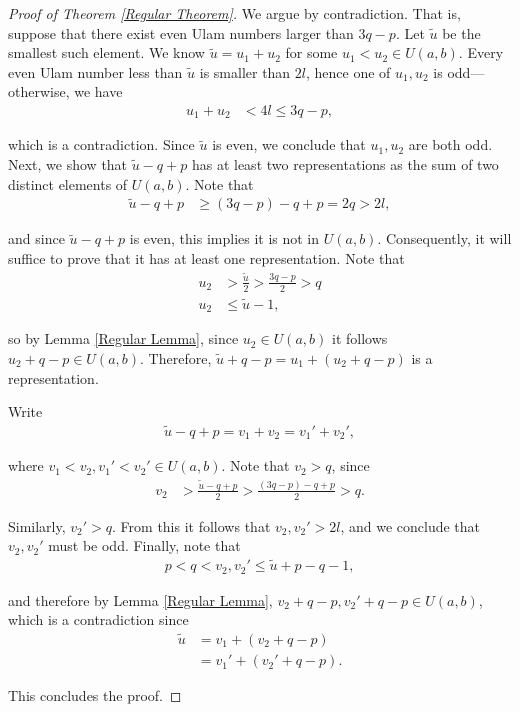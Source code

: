 \documentclass{amsart}
\theoremstyle{theorem}
\theoremstyle{definition}
\begin{document}
\begin{proof}[Proof of Theorem \ref{Regular Theorem}]
We argue by contradiction. That is, suppose that there exist even Ulam numbers larger than $3q - p$. Let $\tilde{u}$ be the smallest such element. We know $\tilde{u} = u_1 + u_2$ for some $u_1 < u_2 \in U(a,b)$. Every even Ulam number less than $\tilde{u}$ is smaller than $2l$, hence one of $u_1, u_2$ is odd---otherwise, we have
	\begin{align*}
    u_1 + u_2 &< 4l \leq 3q - p,
    \end{align*}
    
\noindent which is a contradiction. Since $\tilde{u}$ is even, we conclude that $u_1, u_2$ are both odd. Next, we show that $\tilde{u} - q + p$ has at least two representations as the sum of two distinct elements of $U(a,b)$. Note that
	\begin{align*}
	\tilde{u} - q + p &\geq (3q - p) - q + p = 2q > 2l,
    \end{align*}
    
\noindent and since $\tilde{u} - q + p$ is even, this implies it is not in $U(a,b)$. Consequently, it will suffice to prove that it has at least one representation. Note that
	\begin{align*}
    u_2 &> \frac{\tilde{u}}{2} > \frac{3q - p}{2} > q \\
    u_2 &\leq \tilde{u} - 1,
    \end{align*}

\noindent so by Lemma \ref{Regular Lemma}, since $u_2 \in U(a,b)$ it follows $u_2 + q - p \in U(a,b)$. Therefore, $\tilde{u} + q - p = u_1 + (u_2 + q - p)$ is a representation.
    
Write
	\begin{align*}
    \tilde{u} - q + p = v_1 + v_2 = v_1' + v_2',
    \end{align*}
    
\noindent where $v_1 < v_2, v_1' < v_2' \in U(a,b)$. Note that $v_2 > q$, since
	\begin{align*}
    v_2 &> \frac{\tilde{u} - q + p}{2} > \frac{(3q - p) - q + p}{2} > q.
    \end{align*}
    
\noindent Similarly, $v_2' > q$. From this it follows that $v_2, v_2' > 2l$, and we conclude that $v_2, v_2'$ must be odd. Finally, note that
	\begin{align*}
    p < q < v_2, v_2' \leq \tilde{u} + p - q - 1,
    \end{align*}
    
\noindent and therefore by Lemma \ref{Regular Lemma}, $v_2 + q - p, v_2' + q - p \in U(a,b)$, which is a contradiction since
	\begin{align*}
    \tilde{u} &= v_1 + (v_2 + q - p) \\ &= v_1' + (v_2' + q - p).
    \end{align*}
    
\noindent This concludes the proof.
\end{proof}
\end{document}
